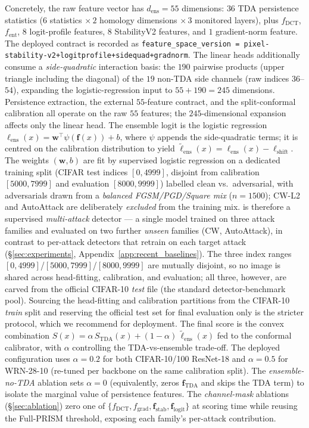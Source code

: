 Concretely, the raw feature vector has $d_\text{ens}=55$ dimensions:
$36$ TDA persistence statistics ($6$ statistics $\times\,2$ homology
dimensions $\times\,3$ monitored layers), plus $f_\mathrm{DCT}$,
$f_\mathrm{ent}$, $8$ logit-profile features, $8$ StabilityV2 features,
and $1$ gradient-norm feature. The deployed contract is recorded as
\texttt{feature\_space\_version =
pixel-stability-v2+logitprofile+sidequad+gradnorm}. The linear heads
additionally consume a \emph{side-quadratic} interaction basis: the
$190$ pairwise products (upper triangle including the diagonal) of the
$19$ non-TDA side channels (raw indices $36$--$54$), expanding the
logistic-regression input to $55+190=245$ dimensions. Persistence
extraction, the external $55$-feature contract, and the split-conformal
calibration all operate on the raw $55$ features; the $245$-dimensional
expansion affects only the linear head.
The ensemble logit is the logistic regression
$\ell_\mathrm{ens}(x) = \mathbf{w}^\top \psi(\mathbf{f}(x)) + b$, where
$\psi$ appends the side-quadratic terms; it is centred on
the calibration distribution to yield
$\tilde\ell_\mathrm{ens}(x) = \ell_\mathrm{ens}(x) - \ell_\mathrm{shift}$.
The weights $(\mathbf{w}, b)$ are fit by supervised logistic regression on a
dedicated training split (CIFAR test indices $[0,4999]$, disjoint from
calibration $[5000,7999]$ and evaluation $[8000,9999]$) labelled clean vs.\
adversarial, with adversarials drawn from a \emph{balanced FGSM/PGD/Square mix}
($n{=}1500$); CW-L2 and AutoAttack are deliberately \emph{excluded} from the
training mix. \prism is therefore a supervised \emph{multi-attack} detector ---
a single model trained on three attack families and evaluated on two further
\emph{unseen} families (CW, AutoAttack), in contrast to per-attack detectors
that retrain on each target attack (\S\ref{sec:experiments},
Appendix~\ref{app:recent_baselines}).
The three index ranges $[0,4999]$/$[5000,7999]$/$[8000,9999]$ are mutually
disjoint, so no image is shared across head-fitting, calibration, and
evaluation; all three, however, are carved from the official CIFAR-10
\emph{test} file (the standard detector-benchmark pool). Sourcing the
head-fitting and calibration partitions from the CIFAR-10 \emph{train}
split and reserving the official test set for final evaluation only is the
stricter protocol, which we recommend for deployment.
The final \prism score is the convex combination
$S(x) = \alpha\, S_\mathrm{TDA}(x) + (1 - \alpha)\, \tilde\ell_\mathrm{ens}(x)$
fed to the \cadg conformal calibrator, with $\alpha$ controlling the
TDA-vs-ensemble trade-off. The deployed configuration uses
$\alpha = 0.2$ for both CIFAR-10/100 ResNet-18 and $\alpha = 0.5$ for
WRN-28-10 (re-tuned per backbone on the same calibration split). The
\emph{ensemble-no-TDA} ablation sets $\alpha = 0$ (equivalently, zeros
$\mathbf{f}_\mathrm{TDA}$ and skips the TDA term) to isolate the
marginal value of persistence features. The \emph{channel-mask}
ablations (\S\ref{sec:ablation}) zero one of
$\{f_\mathrm{DCT}, f_\mathrm{grad}, \mathbf{f}_\mathrm{stab},
\mathbf{f}_\mathrm{logit}\}$ at scoring time while reusing the
Full-PRISM threshold, exposing each family's per-attack contribution.

